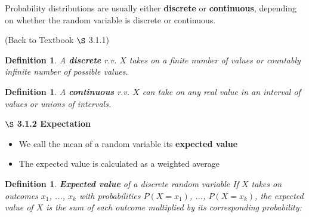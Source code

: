 \documentclass[12pt]{amsart}
\newtheorem{definition}[theorem]{Definition}
\begin{document}
{\vspace{0.5cm}

Probability distributions are usually either \textbf{discrete} or \textbf{continuous}, depending on whether the random variable is discrete or continuous.

\vspace{1cm}

(Back to Textbook $\S$ 3.1.1)
\begin{definition} A \textbf{discrete} r.v. $X$ takes on a finite number of values or countably infinite number of possible values.
\end{definition}

\begin{definition} A \textbf{continuous} r.v. $X$ can take on any real value in an interval of values or unions of intervals.\end{definition}


\vspace{2cm}

\newpage

$\S$ \textbf{3.1.2 Expectation}

\vspace{.5cm}

\begin{itemize}
\item We call the mean of a random variable its \textbf{expected value}
\item The expected value is calculated as a weighted average
\end{itemize}

\vspace{.5cm}

\begin{definition}{\textbf{Expected value} of a discrete random variable} \newline
If $X$ takes on outcomes $x_1$, ..., $x_k$ with probabilities $P(X=x_1)$, ..., $P(X=x_k)$, the expected value of $X$ is the sum of each outcome multiplied by its corresponding probability:


\vspace{3cm}


\end{definition}}
\end{document}
